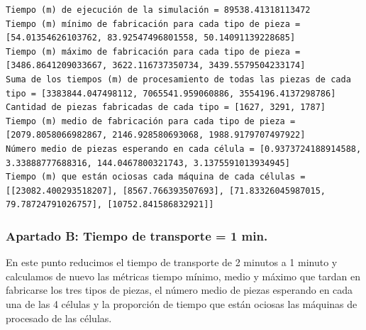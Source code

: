 \documentclass[11pt]{article}
\begin{document}
    \begin{Verbatim}[commandchars=\\\{\}]
Tiempo (m) de ejecución de la simulación = 89538.41318113472
Tiempo (m) mínimo de fabricación para cada tipo de pieza = [54.01354626103762, 83.92547496801558, 50.14091139228685]
Tiempo (m) máximo de fabricación para cada tipo de pieza = [3486.8641209033667, 3622.116737350734, 3439.5579504233174]
Suma de los tiempos (m) de procesamiento de todas las piezas de cada tipo = [3383844.047498112, 7065541.959060886, 3554196.4137298786]
Cantidad de piezas fabricadas de cada tipo = [1627, 3291, 1787]
Tiempo (m) medio de fabricación para cada tipo de pieza = [2079.8058066982867, 2146.928580693068, 1988.9179707497922]
Número medio de piezas esperando en cada célula = [0.9373724188914588, 3.33888777688316, 144.0467800321743, 3.1375591013934945]
Tiempo (m) que están ociosas cada máquina de cada células = [[23082.400293518207], [8567.766393507693], [71.83326045987015, 79.78724791026757], [10752.841586832921]]

    \end{Verbatim}

    \subsubsection{Apartado B: Tiempo de transporte = 1
min.}\label{apartado-b-tiempo-de-transporte-1-min.}

    En este punto reducimos el tiempo de transporte de 2 minutos a 1 minuto
y calculamos de nuevo las métricas tiempo mínimo, medio y máximo que
tardan en fabricarse los tres tipos de piezas, el número medio de piezas
esperando en cada una de las 4 células y la proporción de tiempo que
están ociosas las máquinas de procesado de las células.
\end{document}
